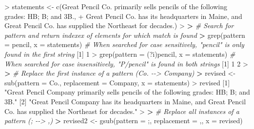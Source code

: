 \documentclass[
]{book}
\newenvironment{Shaded}{\begin{snugshade}}{\end{snugshade}}
\newcommand{\AttributeTok}[1]{\textcolor[rgb]{0.77,0.63,0.00}{#1}}
\newcommand{\CommentTok}[1]{\textcolor[rgb]{0.56,0.35,0.01}{\textit{#1}}}
\newcommand{\DecValTok}[1]{\textcolor[rgb]{0.00,0.00,0.81}{#1}}
\newcommand{\ErrorTok}[1]{\textcolor[rgb]{0.64,0.00,0.00}{\textbf{#1}}}
\newcommand{\FunctionTok}[1]{\textcolor[rgb]{0.00,0.00,0.00}{#1}}
\newcommand{\NormalTok}[1]{#1}
\newcommand{\OtherTok}[1]{\textcolor[rgb]{0.56,0.35,0.01}{#1}}
\newcommand{\SpecialCharTok}[1]{\textcolor[rgb]{0.00,0.00,0.00}{#1}}
\newcommand{\StringTok}[1]{\textcolor[rgb]{0.31,0.60,0.02}{#1}}
\begin{document}
\begin{Shaded}
\begin{Highlighting}[]
\SpecialCharTok{\textgreater{}}\NormalTok{ statements }\OtherTok{\textless{}{-}} \FunctionTok{c}\NormalTok{(}\StringTok{\textquotesingle{}Great Pencil Co. primarily sells pencils of the following grades: HB; B; and 3B.\textquotesingle{}}\NormalTok{,}
\SpecialCharTok{+}                 \StringTok{\textquotesingle{}Great Pencil Co. has its headquarters in Maine, and Great Pencil Co. has supplied the Northeast for decades.\textquotesingle{}}\NormalTok{)}
\SpecialCharTok{\textgreater{}} 
\ErrorTok{\textgreater{}} \CommentTok{\# Search for pattern and return indexex of elements for which match is found}
\ErrorTok{\textgreater{}} \FunctionTok{grep}\NormalTok{(}\AttributeTok{pattern =} \StringTok{\textquotesingle{}pencil\textquotesingle{}}\NormalTok{, }\AttributeTok{x =}\NormalTok{ statements) }\CommentTok{\# When searched for case sensitively, "pencil" is only found in the first string}
\NormalTok{[}\DecValTok{1}\NormalTok{] }\DecValTok{1}
\SpecialCharTok{\textgreater{}} \FunctionTok{grep}\NormalTok{(}\AttributeTok{pattern =} \StringTok{\textquotesingle{}(?i)pencil\textquotesingle{}}\NormalTok{, }\AttributeTok{x =}\NormalTok{ statements) }\CommentTok{\# When searched for case insensitively, "P/pencil" is found in both strings}
\NormalTok{[}\DecValTok{1}\NormalTok{] }\DecValTok{1} \DecValTok{2}
\SpecialCharTok{\textgreater{}} 
\ErrorTok{\textgreater{}} \CommentTok{\# Replace the first instance of a pattern (Co. {-}{-}\textgreater{} Company)}
\ErrorTok{\textgreater{}}\NormalTok{ revised }\OtherTok{\textless{}{-}} \FunctionTok{sub}\NormalTok{(}\AttributeTok{pattern =} \StringTok{\textquotesingle{}Co.\textquotesingle{}}\NormalTok{, }\AttributeTok{replacement =} \StringTok{\textquotesingle{}Company\textquotesingle{}}\NormalTok{, }\AttributeTok{x =}\NormalTok{ statements)}
\SpecialCharTok{\textgreater{}}\NormalTok{ revised}
\NormalTok{[}\DecValTok{1}\NormalTok{] }\StringTok{"Great Pencil Company primarily sells pencils of the following grades: HB; B; and 3B."}                            
\NormalTok{[}\DecValTok{2}\NormalTok{] }\StringTok{"Great Pencil Company has its headquarters in Maine, and Great Pencil Co. has supplied the Northeast for decades."}
\SpecialCharTok{\textgreater{}} 
\ErrorTok{\textgreater{}} \CommentTok{\# Replace all instances of a pattern (; {-}{-}\textgreater{} ,)}
\ErrorTok{\textgreater{}}\NormalTok{ revised2 }\OtherTok{\textless{}{-}} \FunctionTok{gsub}\NormalTok{(}\AttributeTok{pattern =} \StringTok{\textquotesingle{};\textquotesingle{}}\NormalTok{, }\AttributeTok{replacement =} \StringTok{\textquotesingle{},\textquotesingle{}}\NormalTok{, }\AttributeTok{x =}\NormalTok{ revised)}

\end{Highlighting}
\end{Shaded}
\end{document}
